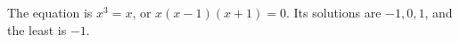 The equation is $x^3=x$, or $x(x-1)(x+1)=0$. Its solutions are $-1,0,1$, and the least is $\boxed{-1}$.
